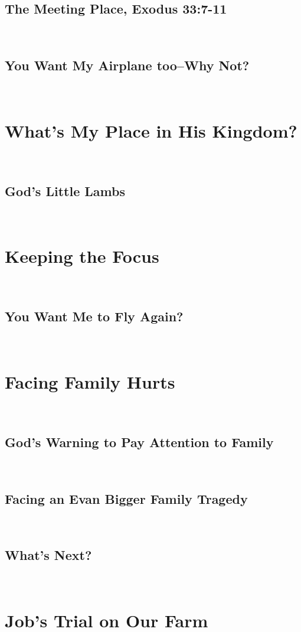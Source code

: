 \documentclass[oneside]{book}
\begin{document}
\section{The Meeting Place, Exodus 33:7-11}
\

\section{You Want My Airplane too--Why Not?}
\

\chapter{What's My Place in His Kingdom?}
\

\section{God's Little Lambs}
\

\chapter{Keeping the Focus}
\

\section{You Want Me to Fly Again?}
\

\chapter{Facing Family Hurts}
\

\section{God's Warning to Pay Attention to Family}
\

\section{Facing an Evan Bigger Family Tragedy}
\

\section{What's Next?}
\

\chapter{Job's Trial on Our Farm}
\
\end{document}
